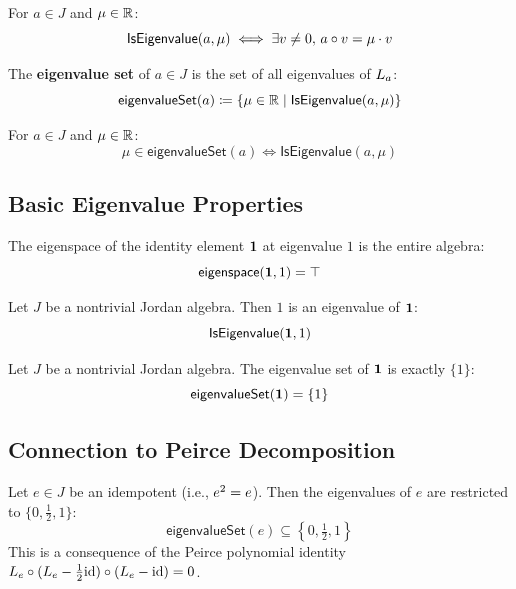 \begin{lemma}
For $a \in J$ and $\mu \in \mathbb{R}$:
\[ \mathsf{IsEigenvalue}(a, \mu) \iff \exists v \ne 0,\, a \circ v = \mu \cdot v \]
\end{lemma}

\begin{definition}[eigenvalueSet]
The \textbf{eigenvalue set} of $a \in J$ is the set of all eigenvalues of $L_{a}$:
\[ \mathsf{eigenvalueSet}(a) \coloneqq \{ \mu \in \mathbb{R} \mid \mathsf{IsEigenvalue}(a, \mu) \} \]
\end{definition}

\begin{lemma}
For $a \in J$ and $\mu \in \mathbb{R}$:
\[ \mu \in \mathsf{eigenvalueSet}(a) \iff \mathsf{IsEigenvalue}(a, \mu) \]
\end{lemma}

\subsection{Basic Eigenvalue Properties}

\begin{theorem}
The eigenspace of the identity element $\mathbf{1}$ at eigenvalue $1$ is the entire algebra:
\[ \mathsf{eigenspace}(\mathbf{1}, 1) = \top \]
\end{theorem}

\begin{theorem}
Let $J$ be a nontrivial Jordan algebra. Then $1$ is an eigenvalue of $\mathbf{1}$:
\[ \mathsf{IsEigenvalue}(\mathbf{1}, 1) \]
\end{theorem}

\begin{theorem}
Let $J$ be a nontrivial Jordan algebra. The eigenvalue set of $\mathbf{1}$ is exactly $\{1\}$:
\[ \mathsf{eigenvalueSet}(\mathbf{1}) = \{1\} \]
\end{theorem}

\subsection{Connection to Peirce Decomposition}

\begin{theorem}
Let $e \in J$ be an idempotent (i.e., $e^{2} = e$). Then the eigenvalues of $e$ are restricted to $\{0, \tfrac{1}{2}, 1\}$:
\[ \mathsf{eigenvalueSet}(e) \subseteq \left\{0, \tfrac{1}{2}, 1\right\} \]
This is a consequence of the Peirce polynomial identity $L_{e} \circ (L_{e} - \tfrac{1}{2}\mathrm{id}) \circ (L_{e} - \mathrm{id}) = 0$.
\end{theorem}

